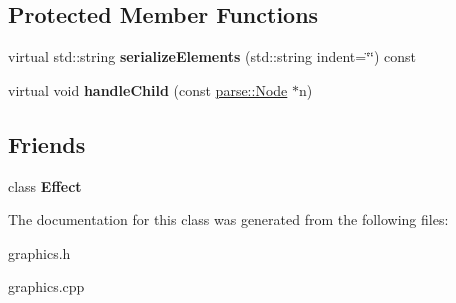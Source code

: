 \subsection*{Protected Member Functions}
\begin{DoxyCompactItemize}
\item 
\hypertarget{classg2c_1_1_field_afb63850b58d85cc453b92ae33b6daffc}{
virtual std::string {\bfseries serializeElements} (std::string indent=\char`\"{}\char`\"{}) const }
\label{classg2c_1_1_field_afb63850b58d85cc453b92ae33b6daffc}

\item 
\hypertarget{classg2c_1_1_field_a3ad80573ea120cd6fda91eaff0a246e9}{
virtual void {\bfseries handleChild} (const \hyperlink{classparse_1_1_node}{parse::Node} $\ast$n)}
\label{classg2c_1_1_field_a3ad80573ea120cd6fda91eaff0a246e9}

\end{DoxyCompactItemize}
\subsection*{Friends}
\begin{DoxyCompactItemize}
\item 
\hypertarget{classg2c_1_1_field_ac8649272bb0576cc72f2486439664efe}{
class {\bfseries Effect}}
\label{classg2c_1_1_field_ac8649272bb0576cc72f2486439664efe}

\end{DoxyCompactItemize}


The documentation for this class was generated from the following files:\begin{DoxyCompactItemize}
\item 
graphics.h\item 
graphics.cpp\end{DoxyCompactItemize}
